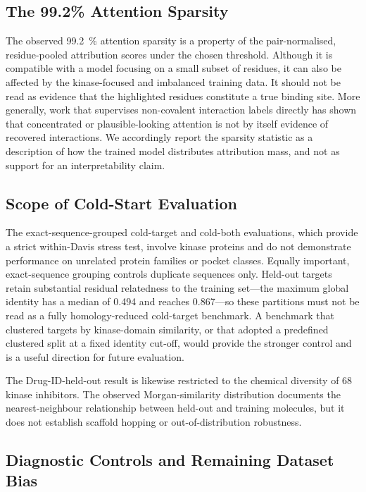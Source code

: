 \documentclass[fleqn,10pt]{wlscirep}
\begin{document}
\subsection{The 99.2\% Attention Sparsity}

The observed \SI{99.2}{\percent} attention sparsity is a property of the
pair-normalised, residue-pooled attribution scores under the chosen threshold. Although it is
compatible with a model focusing on a small subset of residues, it can also be
affected by the kinase-focused and imbalanced training data.  It should not be
read as evidence that the highlighted residues constitute a true binding site.
\begingroup\color{red}
More generally, work that supervises non-covalent interaction labels directly
has shown that concentrated or plausible-looking attention is not by itself
evidence of recovered
interactions.\cite{li2020monn,gim2023arkdta,seo2024blendnet}  We accordingly
report the sparsity statistic as a description of how the trained model
distributes attribution mass, and not as support for an interpretability claim.
\endgroup

\subsection{Scope of Cold-Start Evaluation}

\begingroup\color{red}
The exact-sequence-grouped cold-target and cold-both evaluations, which provide
a strict within-Davis stress test, involve kinase proteins and do not
demonstrate performance on unrelated protein families or pocket classes.
Equally important, exact-sequence grouping controls duplicate sequences only.
Held-out targets retain substantial residual relatedness to the training
set---the maximum global identity has a median of 0.494 and reaches 0.867---so
these partitions must not be read as a fully homology-reduced cold-target
benchmark.  A benchmark that clustered targets by kinase-domain similarity, or
that adopted a predefined clustered split at a fixed identity cut-off, would
provide the stronger control and is a useful direction for future evaluation.
\endgroup

The Drug-ID-held-out result is likewise restricted to the chemical diversity of 68
kinase inhibitors.  The observed Morgan-similarity distribution documents the
nearest-neighbour relationship between held-out and training molecules, but it
does not establish scaffold hopping or out-of-distribution robustness.

\subsection{Diagnostic Controls and Remaining Dataset Bias}
\end{document}
